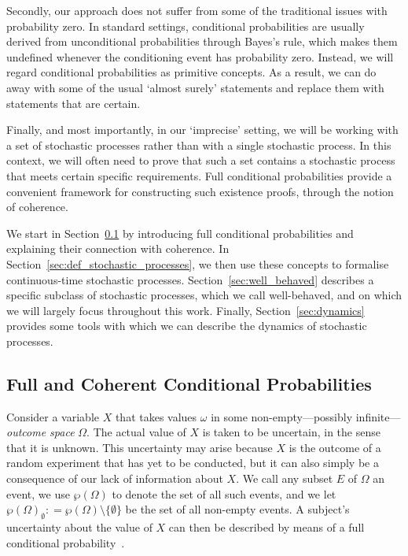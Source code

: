 \documentclass[10pt,a4paper]{paper}
\theoremstyle{definition}
\newcommand{\paths}{\Omega}
\newcommand{\power}{\wp(\paths)}
\newcommand{\nonemptypower}{\power_{\emptyset}}
\newcommand{\coloneqq}{:\!=}
\begin{document}
Secondly, our approach does not suffer from some of the traditional issues with probability zero. In standard settings, conditional probabilities are usually derived from unconditional probabilities through Bayes's rule, which makes them undefined whenever the conditioning event has probability zero. Instead, we will regard conditional probabilities as primitive concepts. As a result, we can do away with some of the usual `almost surely' statements and replace them with statements that are certain.

Finally, and most importantly, in our `imprecise' setting, we will be working with a set of stochastic processes rather than with a single stochastic process. In this context, we will often need to prove that such a set contains a stochastic process that meets certain specific requirements. 
Full conditional probabilities provide a convenient framework for constructing such existence proofs, through the notion of coherence.


We start in Section~\ref{sec:cond_prob} by introducing full conditional probabilities and explaining their connection with coherence. In Section~\ref{sec:def_stochastic_processes}, we then use these concepts to formalise continuous-time stochastic processes. Section~\ref{sec:well_behaved} describes a specific subclass of stochastic processes, which we call well-behaved, and on which we will largely focus throughout this work. Finally, Section~\ref{sec:dynamics} provides some tools with which we can describe the dynamics of stochastic processes.

\subsection{Full and Coherent Conditional Probabilities}\label{sec:cond_prob}


Consider a variable $X$ that takes values $\omega$ in some non-empty---possibly infinite---\emph{outcome space} $\Omega$. The actual value of $X$ is taken to be uncertain, in the sense that it is unknown. This uncertainty may arise because $X$ is the outcome of a random experiment that has yet to be conducted, but it can also simply be a consequence of our lack of information about $X$. 
We call any subset $E$ of $\Omega$ an event, we use $\power$ to denote the set of all such events, and we let $\nonemptypower\coloneqq\power\setminus\{\emptyset\}$ be the set of all non-empty events. 
A subject's uncertainty about the value of $X$ can then be described by means of a full conditional probability~\cite{Dubins:1975ej}.
\end{document}
